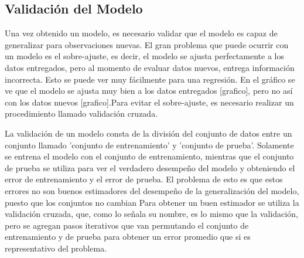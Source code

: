 \subsection{Validación del Modelo}

Una vez obtenido un modelo, es necesario validar que el modelo es capaz de generalizar para observaciones nuevas. El gran problema que puede ocurrir con un modelo es el sobre-ajuste, es decir, el modelo se ajusta perfectamente a los datos entregados, pero al momento de evaluar datos nuevos, entrega información incorrecta. Esto se puede ver muy fácilmente para una regresión. En el gráfico se ve que el modelo se ajusta muy bien a los datos entregados [grafico], pero no así con los datos nuevos [grafico].Para evitar el sobre-ajuste, es necesario realizar un procedimiento llamado validación cruzada.

La validación de un modelo consta de la división del conjunto de datos entre un conjunto llamado 'conjunto de entrenamiento' y 'conjunto de prueba'. Solamente se entrena el modelo con el conjunto de entrenamiento, mientras que el conjunto de prueba se utiliza para ver el verdadero desempeño del modelo y obteniendo el error de entrenamiento y el error de prueba. El problema de esto es que estos errores no son buenos estimadores del desempeño de la generalización del modelo, puesto que los conjuntos no cambian Para obtener un buen estimador se utiliza la validación cruzada, que, como lo señala su nombre, es lo mismo que la validación, pero se agregan pasos iterativos que van permutando el conjunto de entrenamiento y de prueba para obtener un error promedio que si es representativo del problema.


